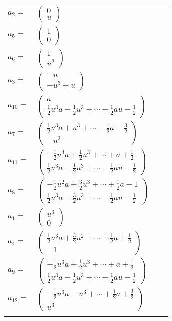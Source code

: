 \documentclass[1p]{elsarticle_modified}
\theoremstyle{definition}
\begin{document}
\begin{tabular}{m{7pt} m{180pt} m{7pt} m{180pt} }
\flushright $a_{2}=$&$\begin{pmatrix}0\\u\end{pmatrix}$ \\
\flushright $a_{5}=$&$\begin{pmatrix}1\\0\end{pmatrix}$ \\
\flushright $a_{6}=$&$\begin{pmatrix}1\\u^2\end{pmatrix}$ \\
\flushright $a_{3}=$&$\begin{pmatrix}- u\\- u^3+u\end{pmatrix}$ \\
\flushright $a_{10}=$&$\begin{pmatrix}a\\\frac{1}{2} u^3 a-\frac{1}{2} u^3+\cdots-\frac{1}{2} a u-\frac{1}{2}\end{pmatrix}$ \\
\flushright $a_{7}=$&$\begin{pmatrix}\frac{1}{2} u^3 a+u^3+\cdots-\frac{1}{2} a-\frac{3}{2}\\- u^3\end{pmatrix}$ \\
\flushright $a_{11}=$&$\begin{pmatrix}-\frac{1}{2} u^3 a+\frac{1}{2} u^3+\cdots+a+\frac{1}{2}\\\frac{1}{2} u^3 a-\frac{1}{2} u^3+\cdots-\frac{1}{2} a u-\frac{1}{2}\end{pmatrix}$ \\
\flushright $a_{8}=$&$\begin{pmatrix}-\frac{1}{2} u^2 a+\frac{3}{2} u^3+\cdots+\frac{1}{2} a-1\\\frac{1}{2} u^3 a-\frac{3}{2} u^3+\cdots-\frac{1}{2} a u-\frac{1}{2}\end{pmatrix}$ \\
\flushright $a_{1}=$&$\begin{pmatrix}u^3\\0\end{pmatrix}$ \\
\flushright $a_{4}=$&$\begin{pmatrix}\frac{1}{2} u^3 a+\frac{3}{2} u^2+\cdots+\frac{1}{2} a+\frac{1}{2}\\-1\end{pmatrix}$ \\
\flushright $a_{9}=$&$\begin{pmatrix}-\frac{1}{2} u^3 a+\frac{1}{2} u^3+\cdots+a+\frac{1}{2}\\\frac{1}{2} u^3 a-\frac{1}{2} u^3+\cdots-\frac{1}{2} a u-\frac{1}{2}\end{pmatrix}$ \\
\flushright $a_{12}=$&$\begin{pmatrix}-\frac{1}{2} u^3 a- u^3+\cdots+\frac{1}{2} a+\frac{3}{2}\\u^3\end{pmatrix}$\\&\end{tabular}
\end{document}
